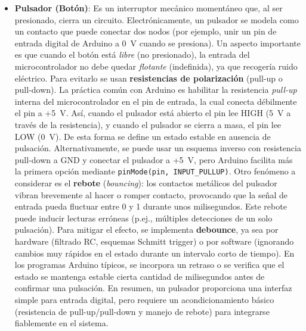 \documentclass{article}
\begin{document}
\begin{itemize}
  \item \textbf{Pulsador (Botón)}: Es un interruptor mecánico momentáneo que, al ser presionado, cierra un circuito. Electrónicamente, un pulsador se modela como un contacto que puede conectar dos nodos (por ejemplo, unir un pin de entrada digital de Arduino a 0~V cuando se presiona). Un aspecto importante es que cuando el botón está \textit{libre} (no presionado), la entrada del microcontrolador no debe quedar \textit{flotante} (indefinida), ya que recogería ruido eléctrico. Para evitarlo se usan \textbf{resistencias de polarización} (pull-up o pull-down). La práctica común con Arduino es habilitar la resistencia \textit{pull-up} interna del microcontrolador en el pin de entrada, la cual conecta débilmente el pin a +5~V. Así, cuando el pulsador está abierto el pin lee HIGH (5~V a través de la resistencia), y cuando el pulsador se cierra a masa, el pin lee LOW (0~V).\cite{Horowitz2015} De esta forma se define un estado estable en ausencia de pulsación. Alternativamente, se puede usar un esquema inverso con resistencia pull-down a GND y conectar el pulsador a +5~V, pero Arduino facilita más la primera opción mediante \texttt{pinMode(pin, INPUT\_PULLUP)}. Otro fenómeno a considerar es el \textbf{rebote} (\textit{bouncing}): los contactos metálicos del pulsador vibran brevemente al hacer o romper contacto, provocando que la señal de entrada pueda fluctuar entre 0 y 1 durante unos milisegundos. Este rebote puede inducir lecturas erróneas (p.ej., múltiples detecciones de un solo pulsación). Para mitigar el efecto, se implementa \textbf{debounce}, ya sea por hardware (filtrado RC, esquemas Schmitt trigger) o por software (ignorando cambios muy rápidos en el estado durante un intervalo corto de tiempo).\cite{Horowitz2015} En los programas Arduino típicos, se incorpora un retraso o se verifica que el estado se mantenga estable cierta cantidad de milisegundos antes de confirmar una pulsación. En resumen, un pulsador proporciona una interfaz simple para entrada digital, pero requiere un acondicionamiento básico (resistencia de pull-up/pull-down y manejo de rebote) para integrarse fiablemente en el sistema.
\end{itemize}
\end{document}
